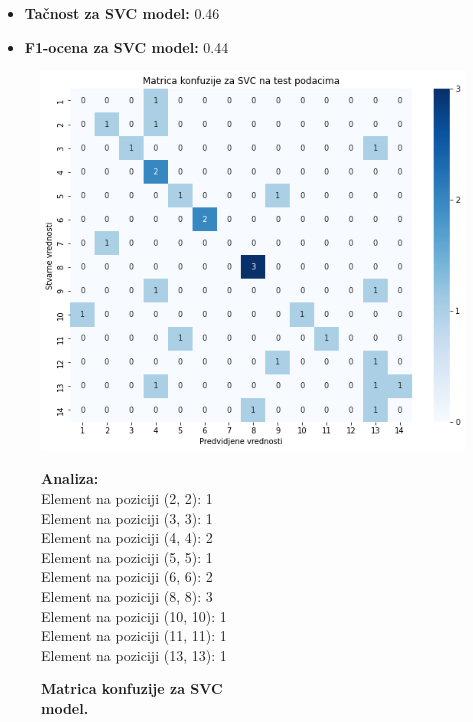 \documentclass{article}
\begin{document}
\begin{flushleft}
\begin{itemize}
  \item \textbf{Tačnost za SVC model:} 0.46
    \item \textbf{F1-ocena za SVC model:} 0.44
\end{itemize}

\begin{figure}[ht]
    \begin{minipage}{0.5\textwidth}
        \centering
        \includegraphics[width=\linewidth]{SVCconf.png}
        \captionsetup{justification=centering}
        \caption*{\textbf{Matrica konfuzije za SVC \\ model.}}
        \label{fig:nedostajuce}
    \end{minipage}%
    \begin{minipage}{0.5\textwidth}
        \textbf{Analiza:}\\
        
        \vspace{1mm}
        Element na poziciji (2, 2): 1\\
        Element na poziciji (3, 3): 1\\
        Element na poziciji (4, 4): 2\\
        Element na poziciji (5, 5): 1\\
        Element na poziciji (6, 6): 2\\
        Element na poziciji (8, 8): 3\\
        Element na poziciji (10, 10): 1\\
        Element na poziciji (11, 11): 1\\
        Element na poziciji (13, 13): 1\\


\end{minipage}
\end{figure}
\end{flushleft}
\end{document}
